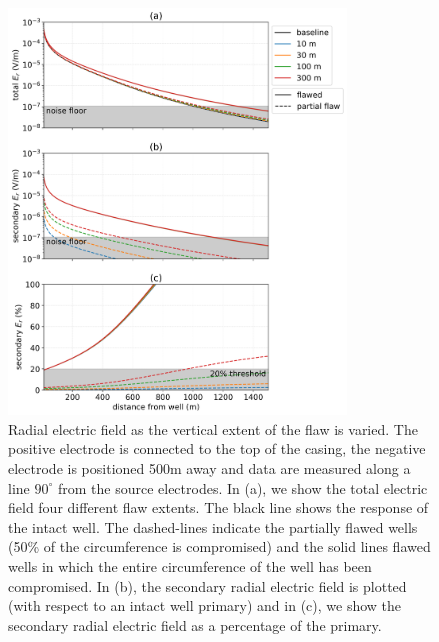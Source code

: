\begin{figure}
    \begin{center}
    \includegraphics[width=0.8\textwidth]{figures/dc_casing/integrity_partial_flaw.png}
    \end{center}
\caption{
    Radial electric field as the vertical extent of the flaw is varied.
    The positive electrode is connected to the top of the casing, the negative electrode
    is positioned 500m away and data are measured along a line $90^\circ$ from the
    source electrodes. In (a), we show the total electric field four different flaw extents.
    The black line shows the response of the intact well.
    The dashed-lines indicate the partially flawed wells (50\% of the circumference is compromised)
    and the solid lines flawed wells in which the entire circumference of the well has been compromised.
    In (b), the secondary radial electric field is plotted (with respect to an intact well primary)
    and in (c), we show the secondary radial electric field as a percentage of the primary.
}
\label{fig:integrity_partial_flaw}
\end{figure}
